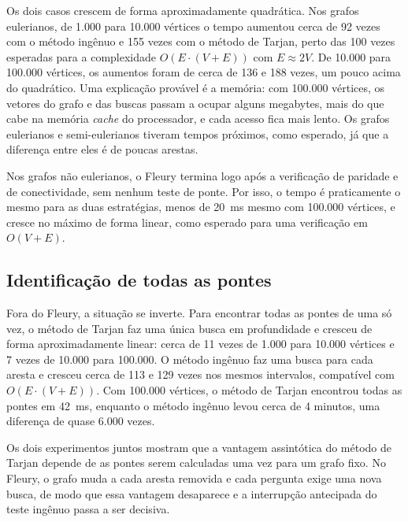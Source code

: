 Os dois casos crescem de forma aproximadamente quadrática. Nos grafos eulerianos, de 1.000 para 10.000 vértices o tempo aumentou cerca de 92 vezes com o método ingênuo e 155 vezes com o método de Tarjan, perto das 100 vezes esperadas para a complexidade $O(E \cdot (V + E))$ com $E \approx 2V$. De 10.000 para 100.000 vértices, os aumentos foram de cerca de 136 e 188 vezes, um pouco acima do quadrático. Uma explicação provável é a memória: com 100.000 vértices, os vetores do grafo e das buscas passam a ocupar alguns megabytes, mais do que cabe na memória \emph{cache} do processador, e cada acesso fica mais lento. Os grafos eulerianos e semi-eulerianos tiveram tempos próximos, como esperado, já que a diferença entre eles é de poucas arestas.

Nos grafos não eulerianos, o Fleury termina logo após a verificação de paridade e de conectividade, sem nenhum teste de ponte. Por isso, o tempo é praticamente o mesmo para as duas estratégias, menos de 20~ms mesmo com 100.000 vértices, e cresce no máximo de forma linear, como esperado para uma verificação em $O(V + E)$.

\subsection{Identificação de todas as pontes}

Fora do Fleury, a situação se inverte. Para encontrar todas as pontes de uma só vez, o método de Tarjan faz uma única busca em profundidade e cresceu de forma aproximadamente linear: cerca de 11 vezes de 1.000 para 10.000 vértices e 7 vezes de 10.000 para 100.000. O método ingênuo faz uma busca para cada aresta e cresceu cerca de 113 e 129 vezes nos mesmos intervalos, compatível com $O(E \cdot (V + E))$. Com 100.000 vértices, o método de Tarjan encontrou todas as pontes em 42~ms, enquanto o método ingênuo levou cerca de 4 minutos, uma diferença de quase 6.000 vezes.

Os dois experimentos juntos mostram que a vantagem assintótica do método de Tarjan depende de as pontes serem calculadas uma vez para um grafo fixo. No Fleury, o grafo muda a cada aresta removida e cada pergunta exige uma nova busca, de modo que essa vantagem desaparece e a interrupção antecipada do teste ingênuo passa a ser decisiva.

